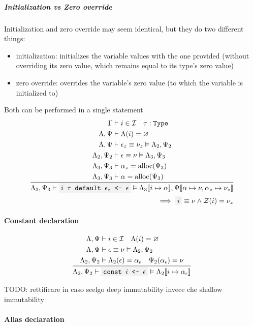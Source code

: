\documentclass[11pt]{report}
\newcommand{\oprule}[3][gathered]{\frac{\begin{#1}#2\end{#1}}{\begin{gathered}#3\end{gathered}}}
\newcommand{\then}{\vdash}
\newcommand{\Then}{\vDash}
\newcommand{\code}[1]{\texttt{\colorbox{gray!10}{#1}}}
\newcommand{\alloc}{\mathrm{alloc}}
\newcommand{\addr}{\alpha}
\newcommand{\expr}{\epsilon}
\newcommand{\val}{\nu}
\newcommand{\Id}{\mathcal{I}}
\newcommand{\Zero}{\mathcal{Z}}
\newcommand{\Type}{\texttt{Type}}
\newcommand{\env}[1]{[\![#1]\!]}
\newcommand{\Env}{\Gamma}
\newcommand{\EnvLoc}{\Lambda}
\newcommand{\EnvStore}{\Psi}
\theoremstyle{definition}
\newcommand{\comment}[1]{
	\parbox{0.9\linewidth}{\color{black!30}\small\sffamily #1}
}
\begin{document}
\subparagraph{Initialization vs Zero override} Initialization and zero
override may seem identical, but they do two different things:
\begin{itemize}
	\item initialization: initializes the variable values with the one provided
		(without overriding its zero value, which remains equal to its type's
		zero value)
	\item zero override: overrides the variable's zero value (to which the
		variable is initialized to)
\end{itemize}
Both can be performed in a single statement
\[
	\oprule[aligned]{
		\Env                  &\then i \in \Id \quad \tau : \Type \\*
		\EnvLoc,\EnvStore     &\then \EnvLoc(i) = \varnothing \\*
		\EnvLoc,\EnvStore     &\then \expr_z \equiv \val_z \Then \EnvLoc_2,\EnvStore_2 \\*
		\EnvLoc_2,\EnvStore_2 &\then \expr \equiv \val \Then \EnvLoc_3,\EnvStore_3 \\*
		\EnvLoc_3,\EnvStore_3 &\then \addr_z = \alloc(\EnvStore_3) \\*
		\EnvLoc_3,\EnvStore_3 &\then \addr = \alloc(\EnvStore_3) \\*
	}{
		\EnvLoc_3,\EnvStore_3 \then \code{$i$ $\tau$ default $\expr_z$ <- $\expr$}
		\Then \EnvLoc_3\env{i \mapsto \addr},\EnvStore\env{\addr \mapsto \val,\addr_z \mapsto \val_z} \\*
		\hfill\implies \code{$i$} \equiv \val \land \Zero(i) = \val_z
	}
\]

\paragraph{Constant declaration}

\[
	\oprule[aligned]{
		\EnvLoc,\EnvStore     &\then i \in \Id \quad \EnvLoc(i) = \varnothing \\*
		\EnvLoc,\EnvStore     &\then \expr \equiv \val \Then \EnvLoc_2,\EnvStore_2 \\*
		\EnvLoc_2,\EnvStore_2 &\then \EnvLoc_2(\expr) = \addr_\expr \quad \EnvStore_2(\addr_\expr) = \val \\*
	}{
		\EnvLoc_2,\EnvStore_2\then \code{const $i$ <- $\expr$} \Then \EnvLoc_2\env{i \mapsto \addr_\expr}
	}
\]

\comment{TODO: rettificare in caso scelgo deep immutability invece che shallow
immutability}

\paragraph{Alias declaration}
\end{document}
